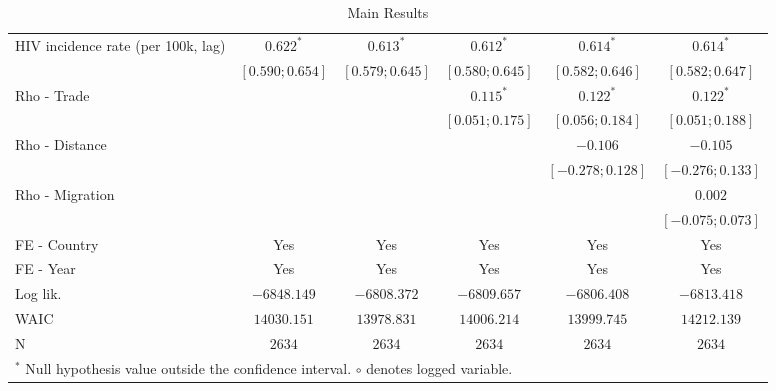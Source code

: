 \begin{sidewaystable}
\begin{center}
{\begin{tabular}{l@{} c@{} c@{} c@{} c@{} c@{}}
HIV incidence rate (per 100k, lag)                           & $0.622^{*}$          & $0.613^{*}$          & $0.612^{*}$          & $0.614^{*}$          & $0.614^{*}$          \\
                                                             & $ [  0.590;  0.654]$ & $ [  0.579;  0.645]$ & $ [  0.580;  0.645]$ & $ [  0.582;  0.646]$ & $ [  0.582;  0.647]$ \\
Rho - Trade                                                  &                      &                      & $0.115^{*}$          & $0.122^{*}$          & $0.122^{*}$          \\
                                                             &                      &                      & $ [  0.051;  0.175]$ & $ [  0.056;  0.184]$ & $ [  0.051;  0.188]$ \\
Rho - Distance                                               &                      &                      &                      & $-0.106$             & $-0.105$             \\
                                                             &                      &                      &                      & $ [ -0.278;  0.128]$ & $ [ -0.276;  0.133]$ \\
Rho - Migration                                              &                      &                      &                      &                      & $0.002$              \\
                                                             &                      &                      &                      &                      & $ [ -0.075;  0.073]$ \\
\midrule
FE - Country                                                 & Yes                  & Yes                  & Yes                  & Yes                  & Yes                  \\
FE - Year                                                    & Yes                  & Yes                  & Yes                  & Yes                  & Yes                  \\
Log lik.                                                     & $-6848.149$          & $-6808.372$          & $-6809.657$          & $-6806.408$          & $-6813.418$          \\
WAIC                                                         & $14030.151$          & $13978.831$          & $14006.214$          & $13999.745$          & $14212.139$          \\
N                                                            & $2634$               & $2634$               & $2634$               & $2634$               & $2634$               \\
\bottomrule
\multicolumn{6}{l}{\scriptsize{$^*$ Null hypothesis value outside the confidence interval.
$\circ$ denotes logged variable.}}
\end{tabular}
}
\caption{Main Results}
\label{table:regressions-main}
\end{center}
\end{sidewaystable}
